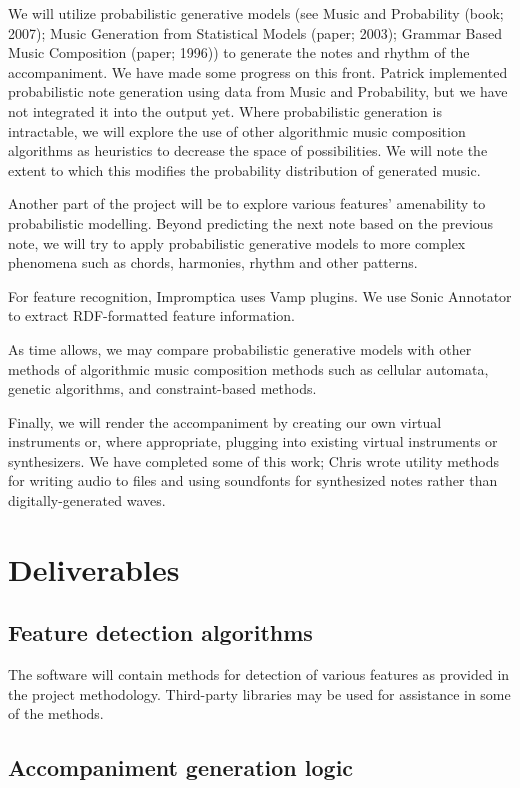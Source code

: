 \documentclass[11pt,conference,letterpaper]{IEEEtran}
\begin{document}
We will utilize probabilistic generative models (see Music and Probability (book; 2007); Music Generation from Statistical Models (paper; 2003); Grammar Based Music Composition (paper; 1996)) to generate the notes and rhythm of the accompaniment. We have made some progress on this front. Patrick implemented probabilistic note generation using data from Music and Probability, but we have not integrated it into the output yet. Where probabilistic generation is intractable, we will explore the use of other algorithmic music composition algorithms as heuristics to decrease the space of possibilities. We will note the extent to which this modifies the probability distribution of generated music.

Another part of the project will be to explore various features’ amenability to probabilistic modelling. Beyond predicting the next note based on the previous note, we will try to apply probabilistic generative models to more complex phenomena such as chords, harmonies, rhythm and other patterns.

For feature recognition, Impromptica uses Vamp plugins. We use Sonic Annotator to extract RDF-formatted feature information.

As time allows, we may compare probabilistic generative models with other methods of algorithmic music composition methods such as cellular automata, genetic algorithms, and constraint-based methods.

Finally, we will render the accompaniment by creating our own virtual instruments or, where appropriate, plugging into existing virtual instruments or synthesizers. We have completed some of this work; Chris wrote utility methods for writing audio to files and using soundfonts for synthesized notes  rather than digitally-generated waves.

\section{Deliverables}
\subsection{Feature detection algorithms}

The software will contain methods for detection of various features as provided in the project methodology. Third-party libraries may be used for assistance in some of the methods.
\subsection{Accompaniment generation logic}
\end{document}
